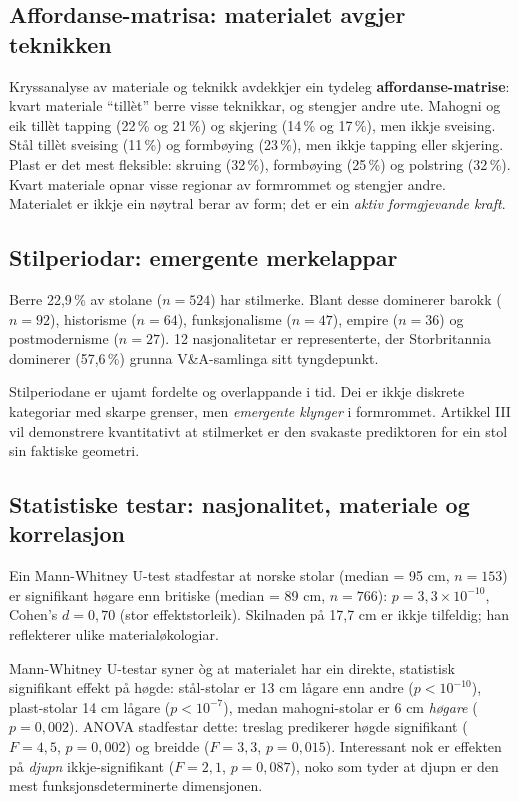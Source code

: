 \documentclass[10pt, a4paper, twocolumn]{article}
\begin{document}
\subsection{Affordanse-matrisa: materialet avgjer teknikken}

Kryssanalyse av materiale og teknikk avdekkjer ein tydeleg \textbf{affordanse-matrise}: kvart materiale ``tillèt'' berre visse teknikkar, og stengjer andre ute. Mahogni og eik tillèt tapping (22\,\% og 21\,\%) og skjering (14\,\% og 17\,\%), men ikkje sveising. Stål tillèt sveising (11\,\%) og formbøying (23\,\%), men ikkje tapping eller skjering. Plast er det mest fleksible: skruing (32\,\%), formbøying (25\,\%) og polstring (32\,\%). Kvart materiale opnar visse regionar av formrommet og stengjer andre. Materialet er ikkje ein nøytral berar av form; det er ein \emph{aktiv formgjevande kraft}.

\subsection{Stilperiodar: emergente merkelappar}

Berre 22,9\,\% av stolane ($n = 524$) har stilmerke. Blant desse dominerer barokk ($n = 92$), historisme ($n = 64$), funksjonalisme ($n = 47$), empire ($n = 36$) og postmodernisme ($n = 27$). 12 nasjonalitetar er representerte, der Storbritannia dominerer (57,6\,\%) grunna V\&A-samlinga sitt tyngdepunkt.

Stilperiodane er ujamt fordelte og overlappande i tid. Dei er ikkje diskrete kategoriar med skarpe grenser, men \emph{emergente klynger} i formrommet. Artikkel III vil demonstrere kvantitativt at stilmerket er den svakaste prediktoren for ein stol sin faktiske geometri.


\subsection{Statistiske testar: nasjonalitet, materiale og korrelasjon}

Ein Mann-Whitney U-test stadfestar at norske stolar (median = 95 cm, $n = 153$) er signifikant høgare enn britiske (median = 89 cm, $n = 766$): $p = 3{,}3 \times 10^{-10}$, Cohen's $d = 0{,}70$ (stor effektstorleik). Skilnaden på 17,7 cm er ikkje tilfeldig; han reflekterer ulike materialøkologiar.

Mann-Whitney U-testar syner òg at materialet har ein direkte, statistisk signifikant effekt på høgde: stål-stolar er 13 cm lågare enn andre ($p < 10^{-10}$), plast-stolar 14 cm lågare ($p < 10^{-7}$), medan mahogni-stolar er 6 cm \emph{høgare} ($p = 0{,}002$). ANOVA stadfestar dette: treslag predikerer høgde signifikant ($F = 4{,}5$, $p = 0{,}002$) og breidde ($F = 3{,}3$, $p = 0{,}015$). Interessant nok er effekten på \emph{djupn} ikkje-signifikant ($F = 2{,}1$, $p = 0{,}087$), noko som tyder at djupn er den mest funksjonsdeterminerte dimensjonen.
\end{document}
